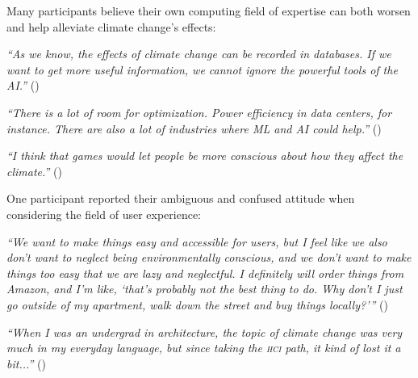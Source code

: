     Many participants believe their own computing field of expertise can both worsen and help alleviate climate change's effects: %
        
    
    \begin{quoting}
        \textit{
        ``As we know, the effects of climate change can be recorded in databases. If we want to get more useful information, we cannot ignore the powerful tools of the AI.''       }()
    \end{quoting}
    
    \begin{quoting}
        \textit{
        ``There is a lot of room for optimization. Power efficiency in data centers, for instance. There are also a lot of industries where ML and AI could help.''
        }  ()
    \end{quoting}
    
    \begin{quoting}
        \textit{
        ``I think that games would let people be more conscious about how they affect the climate.''
        }()
    \end{quoting}
    
    One participant reported their ambiguous and confused attitude when considering the field of user experience:
    
    \begin{quoting}
        \textit{
        ``We want to make things easy and accessible for users, but I feel like we also don't want to neglect being environmentally conscious, and we don't want to make things too easy that we are lazy and neglectful. I definitely will order things from Amazon, and I'm like, `that's probably not the best thing to do. Why don't I just go outside of my apartment, walk down the street and buy things locally?'\thinspace''  %
        }()
    \end{quoting}
    
    \begin{quoting}
        \textit{
        ``When I was an undergrad in architecture, the topic of climate change was very much in my everyday language, but since taking the \textsc{hci} path, it kind of lost it a bit...''        }()
    \end{quoting}
    
